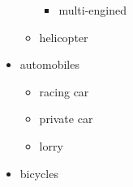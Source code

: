 \begin{Example}
\begin{ShowOutput}[\baselineskip]
\begin{itemize}
\begin{itemize}
\begin{itemize}
        \item multi-engined
      \end{itemize}
      \item helicopter
    \end{itemize}
    \item automobiles
    \begin{itemize}
      \item racing car
      \item private car
      \item lorry
    \end{itemize}
    \item bicycles
  \end{itemize}
  \end{ShowOutput}
\end{Example}
%
%
%
%
%
%
%



